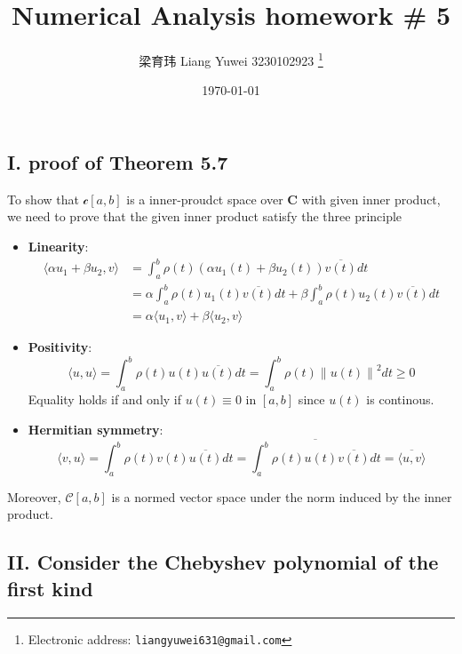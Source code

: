 \documentclass[a4paper]{article}
\newcommand{\norm}[1]{\left\|#1\right\|}
\newcommand{\innerProduct}[2]{\langle #1 , #2\rangle}
\begin{document}
\title{Numerical Analysis homework \# 5}

\author{梁育玮 Liang Yuwei 3230102923
  \thanks{Electronic address: \texttt{liangyuwei631@gmail.com}}}
\date{\today}

\maketitle


\subsection*{I. proof of Theorem 5.7}
To show that $\mathcal{c}[a,b]$ is a inner-proudct space over \(\mathbf{C}\) with given inner product, we need to prove that 
the given inner product satisfy the three principle
\begin{itemize}
    \item \textbf{Linearity}: \begin{align*}
        \langle \alpha u_1 + \beta u_2,v \rangle& = \int_a^b \rho(t) \left(\alpha u_1(t) + \beta u_2(t) \right) \overline{v(t)}dt\\   
        & = \alpha\int_{a}^{b} \rho(t) u_1(t)\overline{v(t)} dt + \beta \int_{a}^{b} \rho(t) u_2(t)\overline{v(t)} dt
       \\ & = \alpha  \langle u_1, v  \rangle + \beta \langle u_2 , v \rangle
    \end{align*}\item \textbf{Positivity}: \[
        \innerProduct{u}{u} = \int_{a}^{b} \rho(t) u(t) \overline{u(t)} dt= \int_{a}^{b} \rho(t) \norm{u(t)}^2 dt
                     \geq 0\]
Equality holds if and only if \(u(t) \equiv 0\) in \([a,b]\) since \(u(t)\) is continous.
    \item \textbf{Hermitian symmetry}:        \[ \innerProduct{v}{u} =\int_{a}^{b} \rho(t) v(t) \overline{u(t)} dt 
    = \overline{\int_{a}^{b} \rho(t) u(t) \overline{v(t)} dt} = \overline{\innerProduct{u}{v}} \]
\end{itemize}
Moreover, \(\mathcal{C}[a,b]\) is a normed vector space under the norm induced by the inner product.

\subsection*{II. Consider the Chebyshev polynomial of the first kind}
\end{document}
